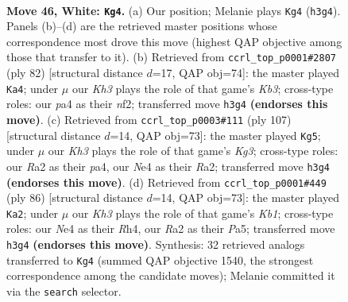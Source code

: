 \documentclass[11pt]{article}
\begin{document}
\clearpage

\begin{figure}[p]\centering
\begin{subfigure}{0.46\textwidth}\centering
\resizebox{\linewidth}{!}{%
\newchessgame
\chessboard[
  setfen={7r/4k3/8/1b2p3/pP2N3/6PK/R7/8 w - - 5 46},
  showmover=false,
  pgfstyle=straightmove, color=movearrow, markmove={h3-g4}
]}
\caption{}
\end{subfigure}\hfill
\begin{subfigure}{0.46\textwidth}\centering
\resizebox{\linewidth}{!}{%
\newchessgame
\chessboard[
  setfen={5k2/8/p1N5/8/1P6/1K4r1/5n2/4R3 w - - 0 42},
  showmover=false,
  pgfstyle=straightmove, color=movearrow, markmove={b3-a4}
]}
\caption{}
\end{subfigure}
\\[4pt]
\begin{subfigure}{0.46\textwidth}\centering
\resizebox{\linewidth}{!}{%
\newchessgame
\chessboard[
  setfen={8/8/1R4k1/5p1p/P7/4P1P1/r7/4K3 b - - 5 54},
  showmover=false,
  pgfstyle=straightmove, color=movearrow, markmove={g6-g5}
]}
\caption{}
\end{subfigure}\hfill
\begin{subfigure}{0.46\textwidth}\centering
\resizebox{\linewidth}{!}{%
\newchessgame
\chessboard[
  setfen={8/k1p4p/2p5/P7/7R/8/1PP5/1K4r1 w - - 2 44},
  showmover=false,
  pgfstyle=straightmove, color=movearrow, markmove={b1-a2}
]}
\caption{}
\end{subfigure}
\caption{\textbf{Move 46, White: \texttt{Kg4}.} (a) Our position; Melanie plays \texttt{Kg4} (\texttt{h3g4}). Panels (b)--(d) are the retrieved master positions whose correspondence most drove this move (highest QAP objective among those that transfer to it). (b) Retrieved from \texttt{ccrl\_top\_p0001\#2807} (ply 82) [structural distance $d$=17, QAP obj=74]: the master played \texttt{Ka4}; under $\mu$ our \emph{Kh3} plays the role of that game's \emph{Kb3}; cross-type roles: our \emph{p}a4 as their \emph{n}f2; transferred move \texttt{h3g4} \textbf{(endorses this move)}. (c) Retrieved from \texttt{ccrl\_top\_p0003\#111} (ply 107) [structural distance $d$=14, QAP obj=73]: the master played \texttt{Kg5}; under $\mu$ our \emph{Kh3} plays the role of that game's \emph{Kg3}; cross-type roles: our \emph{R}a2 as their \emph{p}a4, our \emph{N}e4 as their \emph{R}a2; transferred move \texttt{h3g4} \textbf{(endorses this move)}. (d) Retrieved from \texttt{ccrl\_top\_p0001\#449} (ply 86) [structural distance $d$=14, QAP obj=73]: the master played \texttt{Ka2}; under $\mu$ our \emph{Kh3} plays the role of that game's \emph{Kb1}; cross-type roles: our \emph{N}e4 as their \emph{R}h4, our \emph{R}a2 as their \emph{P}a5; transferred move \texttt{h3g4} \textbf{(endorses this move)}. Synthesis: 32 retrieved analogs transferred to \texttt{Kg4} (summed QAP objective 1540, the strongest correspondence among the candidate moves); Melanie committed it via the \texttt{search} selector.}
\label{fig:thought-m90}
\end{figure}
\end{document}
